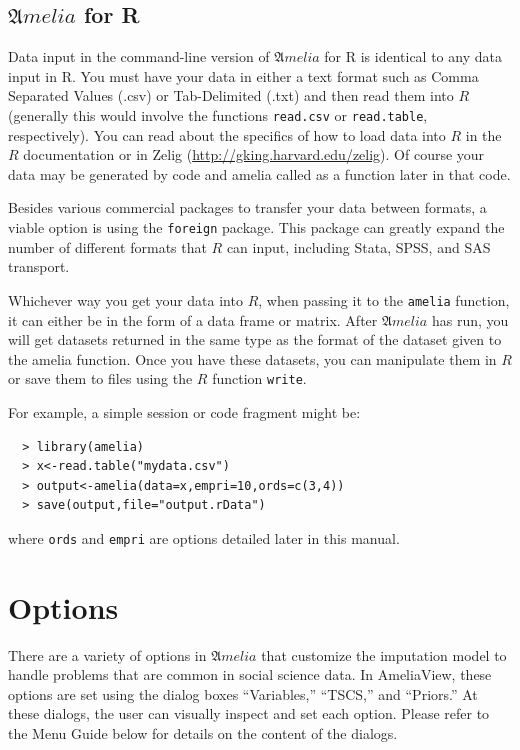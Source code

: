 \documentclass[12pt,titlepage]{article}
\newcommand{\Amelia}{\ensuremath{\mathfrak Amelia} }
\begin{document}
\subsection{\Amelia for R}
\label{sec:data-r}
Data input in the command-line version of ${\mathfrak Amelia}$ for R
is identical to any data input in R.  You must have your data in
either a text format such as Comma Separated Values (.csv) or
Tab-Delimited (.txt) and then read them into $R$ (generally this would
involve the functions \texttt{read.csv} or \texttt{read.table},
respectively).  You can read about the specifics of how to load data
into $R$ in the $R$ documentation or in Zelig
(\url{http://gking.harvard.edu/zelig}).  Of course your data may be
generated by code and amelia called as a function later in that code.

Besides various commercial packages to transfer your data between
formats, a viable option is using the \texttt{foreign} package.  This
package can greatly expand the number of different formats that $R$ can
input, including Stata, SPSS, and SAS transport.

Whichever way you get your data into $R$, when passing it to the
\texttt{amelia} function, it can either be in the form of a data frame
or matrix.  After ${\mathfrak Amelia}$ has run, you will get datasets
returned in the same type as the format of the dataset given to the
amelia function.  Once you have these datasets, you can manipulate
them in $R$ or save them to files using the $R$ function \texttt{write}.

For example, a simple session or code fragment might be:
  \begin{verbatim}
  > library(amelia)
  > x<-read.table("mydata.csv")
  > output<-amelia(data=x,empri=10,ords=c(3,4))
  > save(output,file="output.rData")
  \end{verbatim}
where \texttt{ords} and \texttt{empri} are options detailed later in
this manual.

\section{Options}
\label{sec:options}
There are a variety of options in \Amelia that customize the
imputation model to handle problems that are common in social science
data.  In AmeliaView, these options are set using the dialog boxes
``Variables,'' ``TSCS,'' and ``Priors.''  At these dialogs, the user
can visually inspect and set each option.  Please refer to the Menu
Guide below for details on the content of the dialogs.
\end{document}
